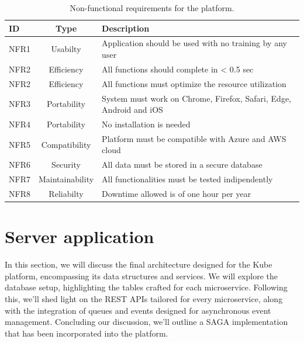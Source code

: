 \begin{table}
    \centering
    \begin{tabular}{|l|c|p{9cm}|}
        \hline
        ID   & Type            & Description                                                        \\ \hline
        NFR1 & Usabilty        & Application should be used with no training by any user            \\ \hline
        NFR2 & Efficiency      & All functions should complete in < 0.5 sec                         \\ \hline
        NFR2 & Efficiency      & All functions must optimize the resource utilization               \\ \hline
        NFR3 & Portability     & System must work on Chrome, Firefox, Safari, Edge, Android and iOS \\ \hline
        NFR4 & Portability     & No installation is needed                                          \\ \hline
        NFR5 & Compatibility   & Platform must be compatible with Azure and AWS cloud               \\ \hline
        NFR6 & Security        & All data must be stored in a secure database                       \\ \hline
        NFR7 & Maintainability & All functionalities must be tested indipendently                   \\ \hline
        NFR8 & Reliabilty      & Downtime allowed is of one hour per year                           \\ \hline
    \end{tabular}
    \caption{Non-functional requirements for the platform.}
    \label{tab:non_functional_requirements}
\end{table}

\section{Server application}
In this section, we will discuss the final architecture designed for the Kube platform, encompassing
its data structures and services. We will explore the database setup, highlighting the tables
crafted for each microservice. Following this, we'll shed light on the REST APIs tailored for every
microservice, along with the integration of queues and events designed for asynchronous event
management. Concluding our discussion, we'll outline a SAGA implementation that has been
incorporated into the platform.
\newpage

